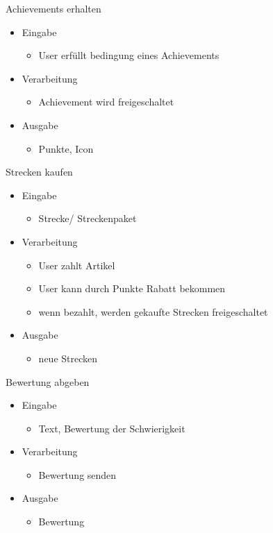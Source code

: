 \documentclass[a4paper, 12pt]{article}
\begin{document}
\bigskip
{\Large Achievements erhalten}\\
\begin{itemize}
\item Eingabe
	\begin{itemize}
	\item User erfüllt bedingung eines Achievements
	\end{itemize}
\item Verarbeitung
	\begin{itemize}
	\item Achievement wird freigeschaltet
	\end{itemize}
\item Ausgabe
	\begin{itemize}
	\item Punkte, Icon
	\end{itemize}
\end{itemize}

\bigskip
{\Large Strecken kaufen}\\
\begin{itemize}
\item Eingabe
	\begin{itemize}
	\item Strecke/ Streckenpaket
	\end{itemize}
\item Verarbeitung
	\begin{itemize}
	\item User zahlt Artikel
	\item User kann durch Punkte Rabatt bekommen
	\item wenn bezahlt, werden gekaufte Strecken freigeschaltet
	\end{itemize}
\item Ausgabe
	\begin{itemize}
	\item neue Strecken
	\end{itemize}
\end{itemize}

\bigskip
{\Large Bewertung abgeben}\\
\begin{itemize}
\item Eingabe
	\begin{itemize}
	\item Text, Bewertung der Schwierigkeit
	\end{itemize}
\item Verarbeitung
	\begin{itemize}
	\item Bewertung senden
	\end{itemize}
\item Ausgabe
	\begin{itemize}
	\item Bewertung
	\end{itemize}
\end{itemize}
\end{document}
